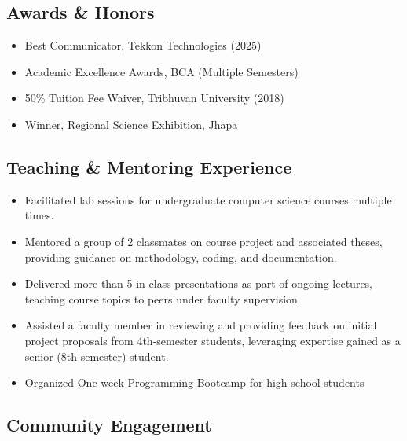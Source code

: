 \hypertarget{awards-honors}{%
\subsection{\texorpdfstring{\textbf{Awards \&
Honors}}{Awards \& Honors}}\label{awards-honors}}

\begin{itemize}
\tightlist
\item
  Best Communicator, Tekkon Technologies (2025)
\item
  Academic Excellence Awards, BCA (Multiple Semesters)
\item
  50\% Tuition Fee Waiver, Tribhuvan University (2018)
\item
  Winner, Regional Science Exhibition, Jhapa
\end{itemize}

\hypertarget{teaching-mentoring-experience}{%
\subsection{\texorpdfstring{\textbf{Teaching \& Mentoring
Experience}}{Teaching \& Mentoring Experience}}\label{teaching-mentoring-experience}}

\begin{itemize}
\tightlist
\item
  Facilitated lab sessions for undergraduate computer science courses
  multiple times.
\item
  Mentored a group of 2 classmates on course project and associated
  theses, providing guidance on methodology, coding, and documentation.
\item
  Delivered more than 5 in-class presentations as part of ongoing
  lectures, teaching course topics to peers under faculty supervision.
\item
  Assisted a faculty member in reviewing and providing feedback on
  initial project proposals from 4th-semester students, leveraging
  expertise gained as a senior (8th-semester) student.
\item
  Organized One-week Programming Bootcamp for high school students
\end{itemize}

\hypertarget{community-engagement}{%
\subsection{\texorpdfstring{\textbf{Community
Engagement}}{Community Engagement}}\label{community-engagement}}

